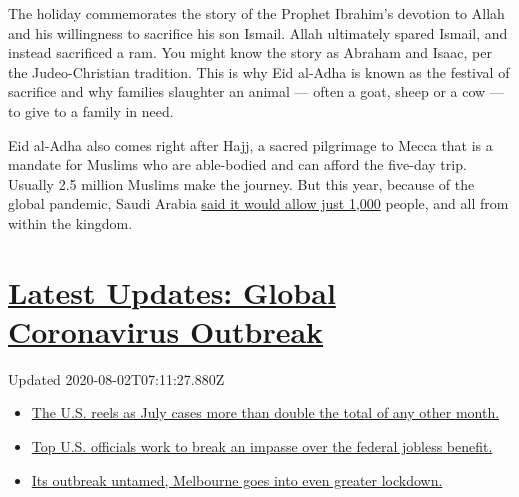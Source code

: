 The holiday commemorates the story of the Prophet Ibrahim's devotion to
Allah and his willingness to sacrifice his son Ismail. Allah ultimately
spared Ismail, and instead sacrificed a ram. You might know the story as
Abraham and Isaac, per the Judeo-Christian tradition. This is why Eid
al-Adha is known as the festival of sacrifice and why families slaughter
an animal --- often a goat, sheep or a cow --- to give to a family in
need.

Eid al-Adha also comes right after Hajj, a sacred pilgrimage to Mecca
that is a mandate for Muslims who are able-bodied and can afford the
five-day trip. Usually 2.5 million Muslims make the journey. But this
year, because of the global pandemic, Saudi Arabia
\href{https://www.nytimes.com/2020/07/30/world/middleeast/pilgrims-hajj-mecca-coronavirus-pandemic.html}{said
it would allow just 1,000} people, and all from within the kingdom.

\hypertarget{latest-updates-global-coronavirus-outbreak}{%
\section{\texorpdfstring{\href{https://www.nytimes.com/2020/08/01/world/coronavirus-covid-19.html?action=click\&pgtype=Article\&state=default\&region=MAIN_CONTENT_1\&context=storylines_live_updates}{Latest
Updates: Global Coronavirus
Outbreak}}{Latest Updates: Global Coronavirus Outbreak}}\label{latest-updates-global-coronavirus-outbreak}}

Updated 2020-08-02T07:11:27.880Z

\begin{itemize}
\tightlist
\item
  \href{https://www.nytimes.com/2020/08/01/world/coronavirus-covid-19.html?action=click\&pgtype=Article\&state=default\&region=MAIN_CONTENT_1\&context=storylines_live_updates\#link-34047410}{The
  U.S. reels as July cases more than double the total of any other
  month.}
\item
  \href{https://www.nytimes.com/2020/08/01/world/coronavirus-covid-19.html?action=click\&pgtype=Article\&state=default\&region=MAIN_CONTENT_1\&context=storylines_live_updates\#link-780ec966}{Top
  U.S. officials work to break an impasse over the federal jobless
  benefit.}
\item
  \href{https://www.nytimes.com/2020/08/01/world/coronavirus-covid-19.html?action=click\&pgtype=Article\&state=default\&region=MAIN_CONTENT_1\&context=storylines_live_updates\#link-2bc8948}{Its
  outbreak untamed, Melbourne goes into even greater lockdown.}
\end{itemize}

